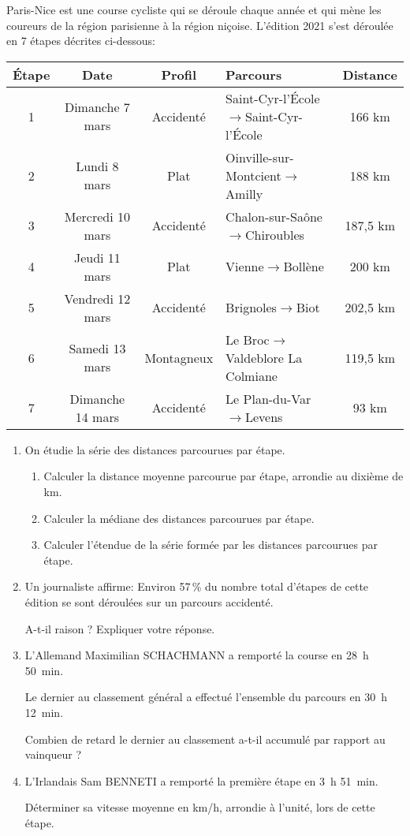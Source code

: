 
\medskip

Paris-Nice est une course cycliste qui se déroule chaque année et qui mène les coureurs de la région parisienne à la région niçoise. L'édition 2021 s'est déroulée en 7 étapes décrites ci-dessous:

\begin{center}
\begin{tabularx}{\linewidth}{|c|c|c|>{\small}X|c|}\hline
\textbf{Étape} &\textbf{Date}&\textbf{Profil}&\textbf{Parcours}&\textbf{Distance}
\\ \hline
1&Dimanche 7 mars&Accidenté&\footnotesize Saint-Cyr-l'École$\to$Saint-Cyr-l'École&166 km\\ \hline
2&Lundi 8 mars&Plat&Oinville-sur-Montcient$\to$Amilly&188 km\\ \hline
3&Mercredi 10 mars&Accidenté& Chalon-sur-Saône$\to$Chiroubles&187,5 km\\ \hline
4&Jeudi 11 mars &Plat&Vienne$\to$Bollène&200 km\\ \hline
5&Vendredi 12 mars&Accidenté&Brignoles$\to$Biot&202,5 km\\ \hline
6&Samedi 13 mars&Montagneux&Le Broc$\to$Valdeblore La Colmiane&119,5 km\\ \hline
7&Dimanche 14 mars&Accidenté& Le Plan-du-Var$\to$Levens&93 km\\ \hline
\end{tabularx}
\end{center}

\begin{enumerate}
\item On étudie la série des distances parcourues par étape.
	\begin{enumerate}
		\item Calculer la distance moyenne parcourue par étape, arrondie au dixième de km. 
		\item Calculer la médiane des distances parcourues par étape.
		\item Calculer l'étendue de la série formée par les distances parcourues par étape.
	\end{enumerate}	
\item Un journaliste affirme: \og Environ 57\,\% du nombre total d'étapes de cette édition se sont déroulées sur un parcours accidenté. \fg{} 

A-t-il raison ? Expliquer votre réponse.
\item L'Allemand Maximilian SCHACHMANN a remporté la course en 28~h 50~min.

Le dernier au classement général a effectué l'ensemble du parcours en 30~h 12~min.

Combien de retard le dernier au classement a-t-il accumulé par rapport au vainqueur ?
\item L'Irlandais Sam BENNETI a remporté la première étape en 3~h 51~min. 

Déterminer sa vitesse moyenne en km/h, arrondie à l'unité, lors de cette étape.
\end{enumerate}

\medskip

